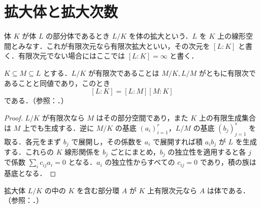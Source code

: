 \section{拡大体と拡大次数}
\begin{defn}[拡大体と次数]
体 $K$ が体 $L$ の部分体であるとき $L/K$ を体の拡大という．$L$ を $K$ 上の線形空間とみなす．これが有限次元なら有限次拡大といい，その次元を $[L:K]$ と書く．有限次元でない場合にはここでは $[L:K]=\infty$ と書く．
\end{defn}
\begin{prop}[拡大次数の塔の公式]
$K\subseteq M\subseteq L$ とする．$L/K$ が有限次であることは $M/K,L/M$ がともに有限次であることと同値であり，このとき
\[
[L:K]=[L:M][M:K]
\]
である．（参照：．）
\end{prop}
\begin{proof}
$L/K$ が有限次なら $M$ はその部分空間であり，また $K$ 上の有限生成集合は $M$ 上でも生成する．逆に $M/K$ の基底 $(a_i)_{i=1}^r$，$L/M$ の基底 $(b_j)_{j=1}^s$ を取る．各元をまず $b_j$ で展開し，その係数を $a_i$ で展開すれば積 $a_i b_j$ が $L$ を生成する．これらの $K$ 線形関係を $b_j$ ごとにまとめ，$b_j$ の独立性を適用すると各 $j$ で係数 $\sum_i c_{ij}a_i=0$ となる．$a_i$ の独立性からすべての $c_{ij}=0$ であり，積の族は基底となる．
\end{proof}
\begin{prop}[有限次元部分代数の体性]
拡大体 $L/K$ の中の $K$ を含む部分環 $A$ が $K$ 上有限次元なら $A$ は体である．（参照：．）
\end{prop}
